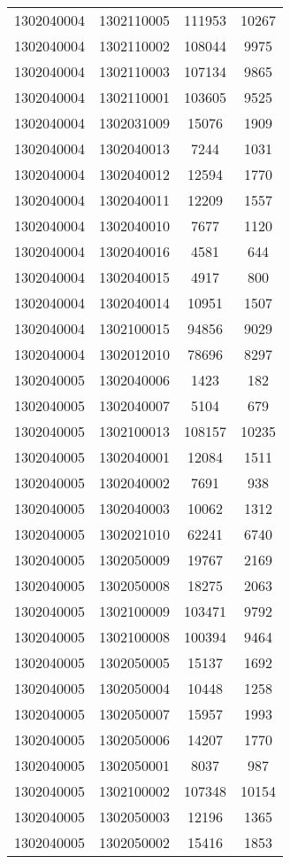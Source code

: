 \begin{longtable}{llcc}
1302040004 & 1302110005 & 111953 & 10267\\
1302040004 & 1302110002 & 108044 & 9975\\
1302040004 & 1302110003 & 107134 & 9865\\
1302040004 & 1302110001 & 103605 & 9525\\
1302040004 & 1302031009 & 15076 & 1909\\
1302040004 & 1302040013 & 7244 & 1031\\
1302040004 & 1302040012 & 12594 & 1770\\
1302040004 & 1302040011 & 12209 & 1557\\
1302040004 & 1302040010 & 7677 & 1120\\
1302040004 & 1302040016 & 4581 & 644\\
1302040004 & 1302040015 & 4917 & 800\\
1302040004 & 1302040014 & 10951 & 1507\\
1302040004 & 1302100015 & 94856 & 9029\\
1302040004 & 1302012010 & 78696 & 8297\\
1302040005 & 1302040006 & 1423 & 182\\
1302040005 & 1302040007 & 5104 & 679\\
1302040005 & 1302100013 & 108157 & 10235\\
1302040005 & 1302040001 & 12084 & 1511\\
1302040005 & 1302040002 & 7691 & 938\\
1302040005 & 1302040003 & 10062 & 1312\\
1302040005 & 1302021010 & 62241 & 6740\\
1302040005 & 1302050009 & 19767 & 2169\\
1302040005 & 1302050008 & 18275 & 2063\\
1302040005 & 1302100009 & 103471 & 9792\\
1302040005 & 1302100008 & 100394 & 9464\\
1302040005 & 1302050005 & 15137 & 1692\\
1302040005 & 1302050004 & 10448 & 1258\\
1302040005 & 1302050007 & 15957 & 1993\\
1302040005 & 1302050006 & 14207 & 1770\\
1302040005 & 1302050001 & 8037 & 987\\
1302040005 & 1302100002 & 107348 & 10154\\
1302040005 & 1302050003 & 12196 & 1365\\
1302040005 & 1302050002 & 15416 & 1853\\

\end{longtable}

